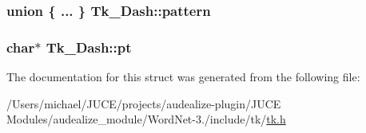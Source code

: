 \subsubsection[{\texorpdfstring{pattern}{pattern}}]{\setlength{\rightskip}{0pt plus 5cm}union \{ ... \}   Tk\+\_\+\+Dash\+::pattern}\hypertarget{struct_tk___dash_ad7f17cc62138295d531b0484909cffaf}{}\label{struct_tk___dash_ad7f17cc62138295d531b0484909cffaf}
\subsubsection[{\texorpdfstring{pt}{pt}}]{\setlength{\rightskip}{0pt plus 5cm}char$\ast$ Tk\+\_\+\+Dash\+::pt}\hypertarget{struct_tk___dash_af91bddbb52ea7c859c39ef6a566386bb}{}\label{struct_tk___dash_af91bddbb52ea7c859c39ef6a566386bb}


The documentation for this struct was generated from the following file\+:\begin{DoxyCompactItemize}
\item 
/\+Users/michael/\+J\+U\+C\+E/projects/audealize-\/plugin/\+J\+U\+C\+E Modules/audealize\+\_\+module/\+Word\+Net-\/3./include/tk/\hyperlink{tk_8h}{tk.\+h}\end{DoxyCompactItemize}
